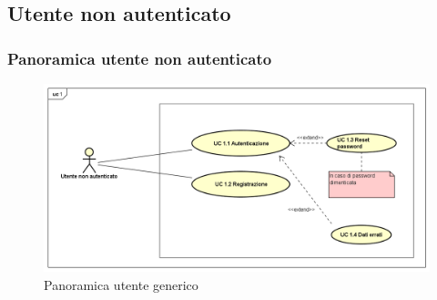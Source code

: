 \subsection{Utente non autenticato}
\subsubsection{Panoramica utente non autenticato}
\begin{figure}[H]
\centering
\includegraphics[width=17cm]{img/UC1.png} 
\caption{Panoramica utente generico}\label{fig:1}
\end{figure}


